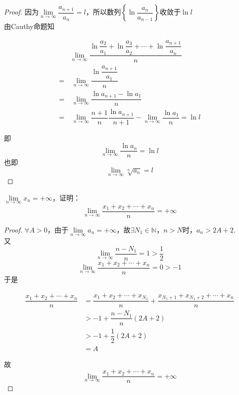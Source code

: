 \begin{proof}

    因为$\lim\limits_{n \to \infty}{\dfrac{a_{n + 1}}{a_n}} = l$，所以数列$\left\{\ln{\dfrac{a_n}{a_{n - 1}}}\right\}$收敛于$\ln{l}$ \\
    由\textup{Cauthy}命题知
    
    \begin{align*}
        & \lim\limits_{n \to \infty}{\dfrac{\ln{\dfrac{a_2}{a_1}} + \ln{\dfrac{a_3}{a_2}} + \cdots + \ln{\dfrac{a_{n + 1}}{a_n}}}{n}} \\
        = & \ \lim\limits_{n \to \infty}{\dfrac{\ln{\dfrac{a_{n + 1}}{a_1}}}{n}} \\
        = & \ \lim\limits_{n \to \infty}{\dfrac{\ln{a_{n + 1} - \ln{a_1}}}{n}} \\
        = & \ \lim\limits_{n \to \infty}{\dfrac{n + 1}{n}\dfrac{\ln{a_{n + 1}}}{n + 1}} - \lim\limits_{n \to \infty}{\dfrac{\ln{a_1}}{n}} = \ln{l}
    \end{align*}

    即
    $$\lim\limits_{n \to \infty}{\dfrac{\ln{a_n}}{n}} = \ln{l}$$
    也即
    $$\lim\limits_{n \to \infty}{\sqrt[n]{a_n}} = l$$

\end{proof}

\begin{proposition}

    $\lim\limits_{n \to \infty}{x_n} = +\infty$，证明：
    $$\lim\limits_{n \to \infty}{\dfrac{x_1 + x_2 + \cdots + x_n}{n}} = +\infty$$

\end{proposition}

\begin{proof} 

    $\forall A > 0$，由于$\lim\limits_{n \to \infty}{a_n} = +\infty$，故$\exists N_1 \in \mathbb{N}$，$n>N$时，$a_n > 2A + 2$. \\
    又
    $$\lim\limits_{n \to \infty}{\dfrac{n - N_1}{n}} = 1 > \dfrac{1}{2}$$
    $$\lim\limits_{n \to \infty}{\dfrac{x_1 + x_2 + \cdots + x_n}{n}} = 0 > -1$$
    于是

    \begin{align*}
        \dfrac{x_1 + x_2 + \cdots + x_n}{n} & = \dfrac{x_1 + x_2 + \cdots + x_{N_1}}{n} + \dfrac{x_{N_1 + 1} + x_{N_1 + 2} + \cdots + x_n}{n} \\
        & > -1 + \dfrac{n - N_1}{n}(2A + 2) \\
        & > -1 + \dfrac{1}{2}(2A + 2) \\
        & = A 
    \end{align*}

    故
    $$\lim\limits_{n \to \infty}{\dfrac{x_1 + x_2 + \cdots + x_n}{n}} = +\infty$$
    
\end{proof} 

